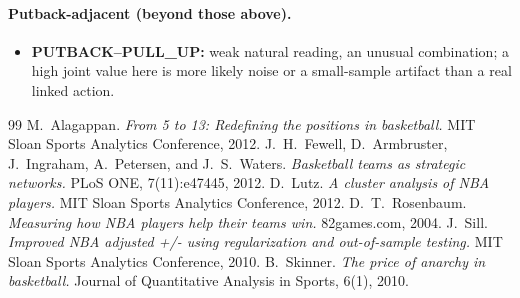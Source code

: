 \documentclass[11pt]{article}
\begin{document}
\paragraph*{Putback-adjacent (beyond those above).}
\begin{itemize}[leftmargin=1.4em,itemsep=0.2em]
 \item \textbf{PUTBACK--PULL\_UP:} weak natural reading, an unusual combination; a high joint
 value here is more likely noise or a small-sample artifact than a real linked action.
\end{itemize}

\begin{thebibliography}{99}
 M.~Alagappan.
  \emph{From 5 to 13: Redefining the positions in basketball.} MIT Sloan Sports
  Analytics Conference, 2012.
 J.~H.~Fewell, D.~Armbruster,
  J.~Ingraham, A.~Petersen, and J.~S.~Waters. \emph{Basketball teams as strategic networks.}
  PLoS ONE, 7(11):e47445, 2012.
 D.~Lutz. \emph{A cluster analysis of NBA players.}
  MIT Sloan Sports Analytics Conference, 2012.
 D.~T.~Rosenbaum.
  \emph{Measuring how NBA players help their teams win.} 82games.com, 2004.
 J.~Sill. \emph{Improved NBA adjusted +/- using
  regularization and out-of-sample testing.} MIT Sloan Sports Analytics Conference, 2010.
 B.~Skinner. \emph{The price of anarchy in
  basketball.} Journal of Quantitative Analysis in Sports, 6(1), 2010.
\end{thebibliography}
\end{document}
